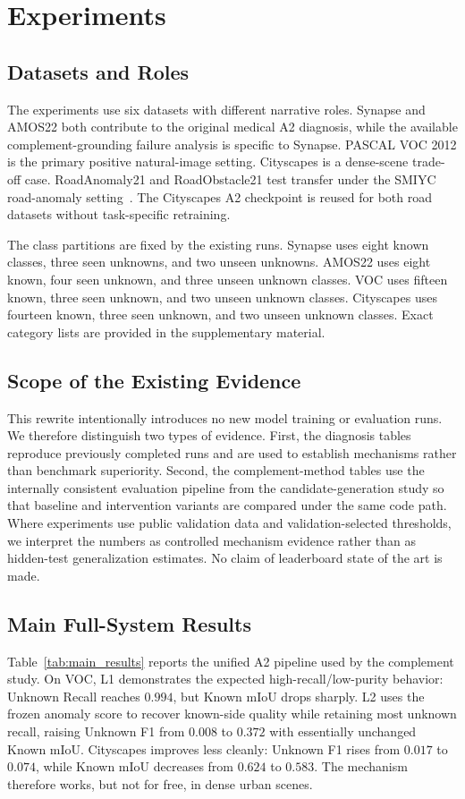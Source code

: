 \documentclass[journal]{IEEEtai}
\begin{document}
\section{Experiments}
\label{sec:experiments}

\subsection{Datasets and Roles}
The experiments use six datasets with different narrative roles. Synapse and AMOS22 both contribute to the original medical A2 diagnosis, while the available complement-grounding failure analysis is specific to Synapse. PASCAL VOC 2012 is the primary positive natural-image setting. Cityscapes is a dense-scene trade-off case. RoadAnomaly21 and RoadObstacle21 test transfer under the SMIYC road-anomaly setting~\cite{chan2021smiyc}. The Cityscapes A2 checkpoint is reused for both road datasets without task-specific retraining.

The class partitions are fixed by the existing runs. Synapse uses eight known classes, three seen unknowns, and two unseen unknowns. AMOS22 uses eight known, four seen unknown, and three unseen unknown classes. VOC uses fifteen known, three seen unknown, and two unseen unknown classes. Cityscapes uses fourteen known, three seen unknown, and two unseen unknown classes. Exact category lists are provided in the supplementary material.

\subsection{Scope of the Existing Evidence}
This rewrite intentionally introduces no new model training or evaluation runs. We therefore distinguish two types of evidence. First, the diagnosis tables reproduce previously completed runs and are used to establish mechanisms rather than benchmark superiority. Second, the complement-method tables use the internally consistent evaluation pipeline from the candidate-generation study so that baseline and intervention variants are compared under the same code path. Where experiments use public validation data and validation-selected thresholds, we interpret the numbers as controlled mechanism evidence rather than as hidden-test generalization estimates. No claim of leaderboard state of the art is made.

\subsection{Main Full-System Results}
Table~\ref{tab:main_results} reports the unified A2 pipeline used by the complement study. On VOC, L1 demonstrates the expected high-recall/low-purity behavior: Unknown Recall reaches $0.994$, but Known mIoU drops sharply. L2 uses the frozen anomaly score to recover known-side quality while retaining most unknown recall, raising Unknown F1 from $0.008$ to $0.372$ with essentially unchanged Known mIoU. Cityscapes improves less cleanly: Unknown F1 rises from $0.017$ to $0.074$, while Known mIoU decreases from $0.624$ to $0.583$. The mechanism therefore works, but not for free, in dense urban scenes.
\end{document}
